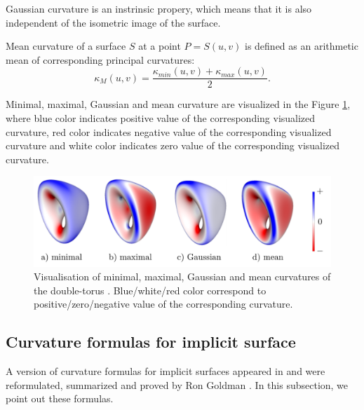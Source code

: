 Gaussian curvature is an
instrinsic propery, which means that it is also independent of the isometric image of the surface.

\begin{definition}
    Mean curvature of a surface $S$ at a point $P=S(u,v)$ is defined as an
    arithmetic mean of corresponding principal curvatures:
    $$\kappa_M(u, v) = \frac{\kappa_{min}(u,v) + \kappa_{max}(u,v)}{2}.$$
\end{definition}

Minimal, maximal, Gaussian and mean curvature are visualized in the Figure \ref{img:16},
where blue color indicates positive value of the corresponding visualized curvature,
red color indicates negative value of the corresponding visualized curvature
and white color indicates zero value of the corresponding visualized curvature.

\begin{figure}
    \centerline{\includegraphics[scale=0.5]{images/img16}}
    \caption[Visualisation of the curvatures of the double-torus]
    {Visualisation of minimal, maximal, Gaussian and mean curvatures of the double-torus \cite{novello2021differential}.
    Blue/white/red color correspond to positive/zero/negative value of the corresponding curvature.}
    \label{img:16}
\end{figure}

\subsection*{Curvature formulas for implicit surface}

A version of curvature formulas for implicit surfaces appeared in \cite{spivak1975comprehensive}
and were reformulated, summarized and proved by Ron Goldman \cite{goldman2005curvature}.
In this subsection, we point out these formulas.


